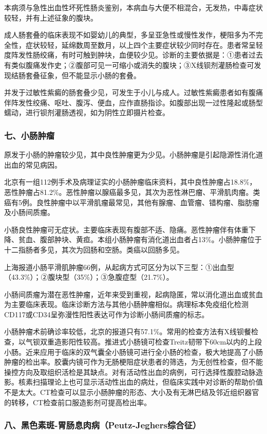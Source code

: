 本病须与急性出血性坏死性肠炎鉴别，本病血与大便不相混合，无发热，中毒症状较轻，并有上述征象的腹块。

成人肠套叠的临床表现不如婴幼儿的典型，多呈亚急性或慢性发作，梗阻多为不完全性，症状较轻，延绵数周至数月，以上四个主要症状较少同时存在。患者常呈轻度阵发性肠绞痛，有时可触到肿块，血便较少见。诊断的主要依据是：①患者过去有类似腹痛发作史；②腹部可见一可缩小或消失的腹块；③X线钡剂灌肠检查可发现结肠套叠征象，但不能显示小肠的套叠。

并发于过敏性紫癜的肠套叠少见，可发生于小儿与成人。过敏性紫癜患者如有腹痛伴阵发性绞痛、呕吐、腹泻、便血，应作直肠指诊。如腹部出现一过性隆起或肠型蠕动，进行钡剂灌肠透视，如为阴性立即摄片检查。

\subsubsection{七、小肠肿瘤}

原发于小肠的肿瘤较少见，其中良性肿瘤更为少见。小肠肿瘤是引起隐源性消化道出血的常见病因。

北京有一组112例手术及病理证实的小肠肿瘤临床资料，其中良性肿瘤占18.8\%，恶性肿瘤占81.2\%。恶性肿瘤以腺癌最多见，其次为恶性淋巴瘤、平滑肌肉瘤。类癌有5例。良性肿瘤中以平滑肌瘤最常见，其他有腺瘤、血管瘤、错构瘤、脂肪瘤及小肠间质瘤。

小肠良性肿瘤可无症状。主要临床表现有腹部不适、隐痛。恶性肿瘤伴有体重下降、贫血、腹部肿块、黄疸。本组小肠肿瘤有消化道出血者占13\%。小肠肿瘤位于十二指肠者多见，其次为回肠和空肠。类癌以回肠多见。

上海报道小肠平滑肌肿瘤66例，从起病方式可区分为以下三型：①出血型（43.3\%）；②腹块型（35\%）；③急腹症型（21.7\%）。

小肠间质瘤为潜在恶性肿瘤，近年来受到重视，起病隐匿，常以消化道出血或贫血为主要临床表现。临床诊断方法与其他小肠肿瘤相似。病理标本免疫组化检测CD117或CD34呈弥漫性阳性表达可作为诊断小肠间质瘤的标志。

小肠肿瘤术前确诊率较低，北京的报道只有57.1\%。常用的检查方法有X线钡餐检查，以气钡双重造影阳性较高。推进式小肠镜可检查Treitz韧带下60cm以内的上段小肠。近来应用于临床的双气囊全小肠镜可进行全小肠的检查，极大地提高了小肠肿瘤的检出率。胶囊内镜可作为无肠梗阻症状患者的筛选，为无创性检查，但不能操控方向及取组织活检是其缺点。对有活动性出血的病例，可行选择性腹腔动脉造影。核素扫描理论上也可显示活动性出血的病灶，但临床实践中对诊断的帮助价值不是太大。CT检查可以显示小肠肿瘤的形态、大小及有无淋巴结及邻近组织器官的转移，CT检查前口服造影剂可提高检出率。

\subsubsection{八、黑色素斑-胃肠息肉病（Peutz-Jeghers综合征）}

